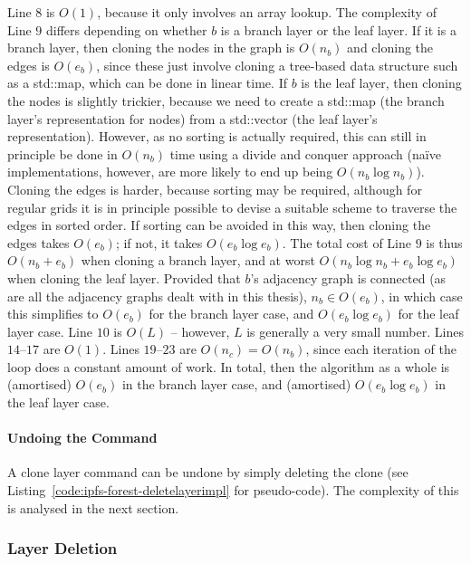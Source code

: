 Line $8$ is $O(1)$, because it only involves an array lookup. The complexity of Line $9$ differs depending on whether $b$ is a branch layer or the leaf layer. If it is a branch layer, then cloning the nodes in the graph is $O(n_b)$ and cloning the edges is $O(e_b)$, since these just involve cloning a tree-based data structure such as a std::map, which can be done in linear time. If $b$ is the leaf layer, then cloning the nodes is slightly trickier, because we need to create a std::map (the branch layer's representation for nodes) from a std::vector (the leaf layer's representation). However, as no sorting is actually required, this can still in principle be done in $O(n_b)$ time using a divide and conquer approach (na\"ive implementations, however, are more likely to end up being $O(n_b \log n_b)$). Cloning the edges is harder, because sorting may be required, although for regular grids it is in principle possible to devise a suitable scheme to traverse the edges in sorted order. If sorting can be avoided in this way, then cloning the edges takes $O(e_b)$; if not, it takes $O(e_b \log e_b)$. The total cost of Line $9$ is thus $O(n_b + e_b)$ when cloning a branch layer, and at worst $O(n_b \log n_b + e_b \log e_b)$ when cloning the leaf layer. Provided that $b$'s adjacency graph is connected (as are all the adjacency graphs dealt with in this thesis), $n_b \in O(e_b)$, in which case this simplifies to $O(e_b)$ for the branch layer case, and $O(e_b \log e_b)$ for the leaf layer case. Line $10$ is $O(L)$ -- however, $L$ is generally a very small number. Lines $14$--$17$ are $O(1)$. Lines $19$--$23$ are $O(n_c) = O(n_b)$, since each iteration of the loop does a constant amount of work. In total, then the algorithm as a whole is (amortised) $O(e_b)$ in the branch layer case, and (amortised) $O(e_b \log e_b)$ in the leaf layer case.

\paragraph{Undoing the Command}

A clone layer command can be undone by simply deleting the clone (see Listing~\ref{code:ipfs-forest-deletelayerimpl} for pseudo-code). The complexity of this is analysed in the next section.


\afterpage{\clearpage}
\newpage

\subsubsection{Layer Deletion}


